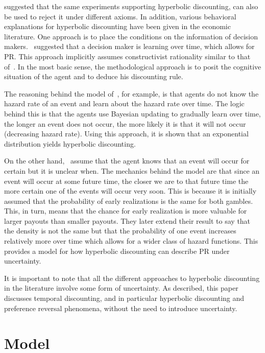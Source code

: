 \documentclass[11pt]{article}
\numberwithin{equation}{section}
\begin{document}
\citet{rubinstein2003economics} suggested that the same experiments supporting hyperbolic discounting, can also be used to reject it under different axioms. In addition, various behavioral explanations for hyperbolic discounting have been given in the economic literature. One approach is to place the conditions on the information of decision makers.~\citet{sozou1998hyperbolic,dasgupta2005uncertainty} suggested that a decision maker is learning over time, which allows for PR. This approach implicitly assumes constructivist rationality similar to that of~\citet{smith2003constructivist}. In the most basic sense, the methodological approach is to posit the cognitive situation of the agent and to deduce his discounting rule.

The reasoning behind the model of~\citet{sozou1998hyperbolic}, for example, is that agents do not know the hazard rate of an event and learn about the hazard rate over time. The logic behind this is that the agents use Bayesian updating to gradually learn over time, the longer an event does not occur, the more likely it is that it will not occur (decreasing hazard rate). Using this approach, it is shown that an exponential distribution yields hyperbolic discounting.

On the other hand,~\citet{dasgupta2005uncertainty} assume that the agent knows that an event will occur for certain but it is unclear when. The mechanics behind the model are that since an event will occur at some future time, the closer we are to that future time the more certain one of the events will occur very soon. This is because it is initially assumed that the probability of early realizations is the same for both gambles. This, in turn, means that the chance for early realization is more valuable for larger payouts than smaller payouts. They later extend their result to say that the density is not the same but that the probability of one event increases relatively more over time which allows for a wider class of hazard functions. This provides a model for how hyperbolic discounting can describe PR under uncertainty.

It is important to note that all the different approaches to hyperbolic discounting in the literature involve some form of uncertainty. As described, this paper discusses temporal discounting, and in particular hyperbolic discounting and preference reversal phenomena, without the need to introduce uncertainty.

\section{Model}\label{sec:model}
\end{document}
